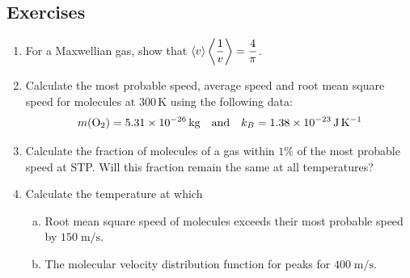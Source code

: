	\subsection*{Exercises}
		\begin{enumerate}
			\item For a Maxwellian gas, show that $\expval{v}\expval{\dfrac{1}{v}}=\dfrac{4}{\pi}$.
			
			\item Calculate the most probable speed, average speed and root mean square speed for  molecules at $300\,\unit{\kelvin}$ using the following data:\vspace{-1.5ex}
			\begin{align*}
				m(\ce{O2})=\num{5.31e-26}\,\unit{\kilo\gram}\qq{and}k_B=\num{1.38e-23}\,\unit{\joule\per\kelvin}
			\end{align*}
			
			\item Calculate the fraction of molecules of a gas within $1\%$ of the most probable speed at STP. Will this fraction remain the same at all temperatures?
			
			\item Calculate the temperature at which\vspace{-1.5ex}
			\begin{enumerate}[(a)]
				\item Root mean square speed of  molecules exceeds their most probable speed by $150\;\unit{\metre\per\second}$.
				\item The molecular velocity distribution function for  peaks for $400\;\unit{\metre\per\second}$.
			\end{enumerate}
		\end{enumerate}
		
